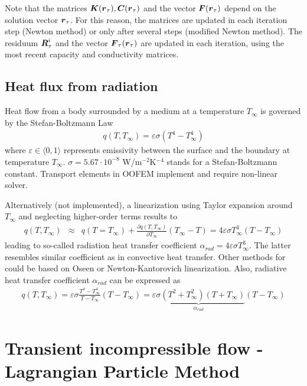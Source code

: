 Note that the matrices $\mbox{\boldmath$K$}(\mbox{\boldmath$r$}_\tau), \mbox{\boldmath$C$}(\mbox{\boldmath$r$}_\tau)$ and the vector $\mbox{\boldmath$F$}(\mbox{\boldmath$r$}_\tau)$ depend on the solution vector $\mbox{\boldmath$r$}_\tau$. For this reason, the matrices are updated in each iteration step (Newton method) or only after several steps (modified Newton method). The residuum $\mbox{\boldmath$R$}_\tau^{i}$ and the vector $\mbox{\boldmath$F$}_\tau(\mbox{\boldmath$r$}_\tau)$ are updated in each iteration, using the most recent capacity and conductivity matrices.

\subsection{Heat flux from radiation}

Heat flow from a body surrounded by a medium at a temperature $T_\infty$ is governed by the Stefan-Boltzmann Law
\begin{eqnarray}
q(T, T_\infty) = \varepsilon \sigma (T^4 - T_\infty^4)\label{eq:StefanBoltzmann}
\end{eqnarray}
where $\varepsilon\in\langle 0, 1 \rangle$ represents emissivity between the surface and the boundary at temperature $T_\infty$. $\sigma=5.67\cdot 10^{-8}$ W/m$^{-2}$K$^{-4}$ stands for a Stefan-Boltzmann constant. Transport elements in OOFEM implement  and require non-linear solver.

Alternatively (not implemented), a linearization using Taylor expansion around $T_\infty$ and neglecting higher-order terms results to
\begin{eqnarray}
q(T, T_\infty) &\approx& q(T=T_\infty) + \frac{\partial q(T,T_\infty)}{\partial T_\infty} (T_\infty-T) = 4\varepsilon \sigma T_\infty^3 (T-T_\infty)
\end{eqnarray}
leading to so-called radiation heat transfer coefficient $\alpha_{rad}=4\varepsilon \sigma T_\infty^3$. The latter resembles similar coefficient as in convective heat transfer. Other methods for  could be based on Oseen or Newton-Kantorovich linearization. Also, radiative heat transfer coefficient $\alpha_{rad}$ can be expressed as \cite[pp.28]{Baehr:06}
\begin{eqnarray}
q(T, T_\infty) = \varepsilon \sigma \frac{T^4 - T_\infty^4}{T-T_\infty}(T-T_\infty) = \underbrace{\varepsilon \sigma (T^2+T_\infty^2)(T+T_\infty)}_{\alpha_{rad}}(T-T_\infty)
\end{eqnarray}



\section{Transient incompressible flow - Lagrangian Particle Method}
